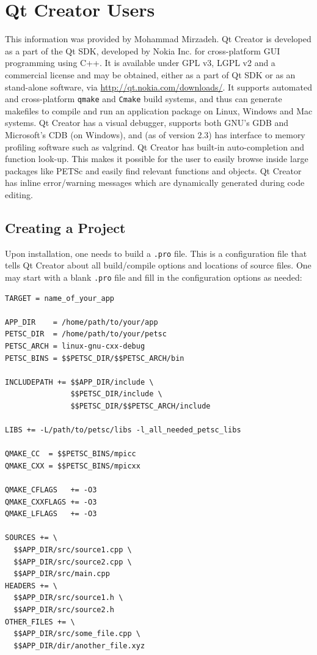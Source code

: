 {{\section{Qt Creator Users} 
This information was provided by Mohammad Mirzadeh.
Qt Creator is developed as a part of the Qt SDK, developed by Nokia Inc. for cross-platform GUI programming using C++. 
It is available under GPL v3, LGPL v2 and a commercial license and may be obtained, either as a part of Qt SDK or as an stand-alone software, via \url{http://qt.nokia.com/downloads/}.
It supports automated and cross-platform \texttt{qmake} and \texttt{Cmake} build systems, and thus can
generate makefiles to compile and run an application package on Linux, Windows and Mac systems.
Qt Creator has a visual debugger, supports both GNU's GDB and Microsoft's CDB (on Windows), and
(as of version 2.3) has interface to memory profiling software such as valgrind.
Qt Creator has built-in auto-completion and function look-up. 
This makes it possible for the user to easily browse inside large packages like PETSc and easily find relevant functions and objects.
Qt Creator has inline error/warning messages which are dynamically generated during code editing.

\subsection*{Creating a Project}
Upon installation, one needs to build a \texttt{.pro} file. This is a configuration file that tells Qt Creator about all build/compile options and locations of source files. 
One may start with a blank \texttt{.pro} file and fill in the configuration options as needed:
\begin{lstlisting}
TARGET = name_of_your_app

APP_DIR    = /home/path/to/your/app
PETSC_DIR  = /home/path/to/your/petsc
PETSC_ARCH = linux-gnu-cxx-debug
PETSC_BINS = $$PETSC_DIR/$$PETSC_ARCH/bin

INCLUDEPATH += $$APP_DIR/include \
               $$PETSC_DIR/include \
               $$PETSC_DIR/$$PETSC_ARCH/include

LIBS += -L/path/to/petsc/libs -l_all_needed_petsc_libs

QMAKE_CC  = $$PETSC_BINS/mpicc
QMAKE_CXX = $$PETSC_BINS/mpicxx

QMAKE_CFLAGS   += -O3
QMAKE_CXXFLAGS += -O3
QMAKE_LFLAGS   += -O3

SOURCES += \
  $$APP_DIR/src/source1.cpp \
  $$APP_DIR/src/source2.cpp \
  $$APP_DIR/src/main.cpp
HEADERS += \
  $$APP_DIR/src/source1.h \
  $$APP_DIR/src/source2.h
OTHER_FILES += \
  $$APP_DIR/src/some_file.cpp \
  $$APP_DIR/dir/another_file.xyz
\end{lstlisting}

}}
